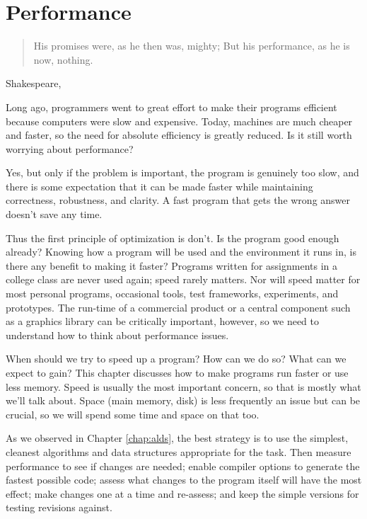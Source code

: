 \chapter{Performance}
\label{chap:performance}
\begin{quotation}
    His promises were, as he then was, mighty; But his performance, as he
    is now, nothing.
\end{quotation}
\begin{quotesrc}
    Shakespeare, 
\end{quotesrc}

Long ago, programmers went to great effort to make their programs efficient
because computers were slow and expensive. Today, machines are much cheaper
and faster, so the need for absolute efficiency is greatly reduced. Is it
still worth worrying about performance?

Yes, but only if the problem is important, the program is genuinely too
slow, and there is some expectation that it can be made faster while
maintaining correctness, robustness, and clarity. A fast program that gets
the wrong answer doesn't save any time.

Thus the first principle of optimization is don't. Is the program good
enough already? Knowing how a program will be used and the environment it
runs in, is there any benefit to making it faster? Programs written for
assignments in a college class are never used again; speed rarely matters.
Nor will speed matter for most personal programs, occasional tools, test
frameworks, experiments, and prototypes. The run-time of a commercial
product or a central component such as a graphics library can be critically
important, however, so we need to understand how to think about performance
issues.

When should we try to speed up a program? How can we do so? What can we
expect to gain? This chapter discusses how to make programs run faster or
use less memory. Speed is usually the most important concern, so that is
mostly what we'll talk about. Space (main memory, disk) is less frequently
an issue but can be crucial, so we will spend some time and space on that
too.

As we observed in Chapter \ref{chap:alds}, the best strategy is to use the
simplest, cleanest algorithms and data structures appropriate for the task.
Then measure performance to see if changes are needed; enable compiler
options to generate the fastest possible code; assess what changes to the
program itself will have the most effect; make changes one at a time and
re-assess; and keep the simple versions for testing revisions against.

